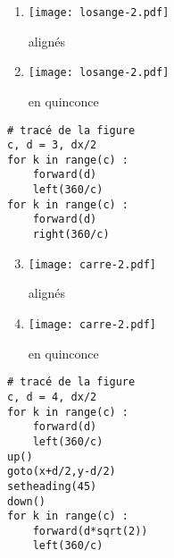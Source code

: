 \documentclass[11pt,a4paper]{article}
\begin{document}
\vspace*{5mm}

\noindent\begin{minipage}[t]{5cm}
\begin{enumerate}\setcounter{enumi}{0}
\item \begin{minipage}{1.75cm}\texttt{[image: losange-2.pdf]}\end{minipage} alignés
\item \begin{minipage}{1.75cm}\texttt{[image: losange-2.pdf]}\end{minipage} en quinconce
\end{enumerate}
\end{minipage}
\hfill
\begin{minipage}[t]{7cm}\footnotesize
\begin{Verbatim}
# tracé de la figure
c, d = 3, dx/2
for k in range(c) :
    forward(d)
    left(360/c)
for k in range(c) :
    forward(d)
    right(360/c)
\end{Verbatim}
\end{minipage}
\vspace*{5mm}

\noindent\begin{minipage}[t]{5cm}
\begin{enumerate}\setcounter{enumi}{2}
\item \begin{minipage}{1.75cm}\texttt{[image: carre-2.pdf]}\end{minipage} alignés
\item \begin{minipage}{1.75cm}\texttt{[image: carre-2.pdf]}\end{minipage} en quinconce
\end{enumerate}
\end{minipage}
\hfill
\begin{minipage}[t]{7cm}\footnotesize
\begin{Verbatim}
# tracé de la figure
c, d = 4, dx/2
for k in range(c) :
    forward(d)
    left(360/c)
up()
goto(x+d/2,y-d/2)
setheading(45)
down()
for k in range(c) :
    forward(d*sqrt(2))
    left(360/c)
\end{Verbatim}
\end{minipage}
\newpage
\end{document}

